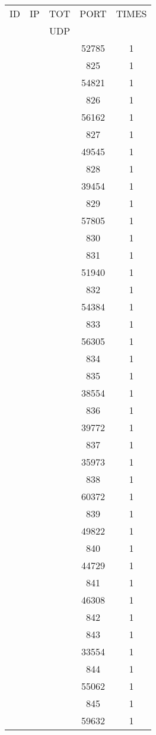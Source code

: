 \documentclass[a4paper]{scrartcl}
\begin{document}
\begin{minipage}[b]{0.5\linewidth}
\begin{tabular}{| c | c | c | c | c |}
\hline
ID & IP & TOT & PORT & TIMES \\ 
   &    & UDP &      &       \\ 
\hline
& & & 52785 & 1 \\ & & & 825 & 1 \\ & & & 54821 & 1 \\ & & & 826 & 1 \\ & & & 56162 & 1 \\ & & & 827 & 1 \\ & & & 49545 & 1 \\ & & & 828 & 1 \\ & & & 39454 & 1 \\ & & & 829 & 1 \\ & & & 57805 & 1 \\ & & & 830 & 1 \\ & & & 831 & 1 \\ & & & 51940 & 1 \\ & & & 832 & 1 \\ & & & 54384 & 1 \\ & & & 833 & 1 \\ & & & 56305 & 1 \\ & & & 834 & 1 \\ & & & 835 & 1 \\ & & & 38554 & 1 \\ & & & 836 & 1 \\ & & & 39772 & 1 \\ & & & 837 & 1 \\ & & & 35973 & 1 \\ & & & 838 & 1 \\ & & & 60372 & 1 \\ & & & 839 & 1 \\ & & & 49822 & 1 \\ & & & 840 & 1 \\ & & & 44729 & 1 \\ & & & 841 & 1 \\ & & & 46308 & 1 \\ & & & 842 & 1 \\ & & & 843 & 1 \\ & & & 33554 & 1 \\ & & & 844 & 1 \\ & & & 55062 & 1 \\ & & & 845 & 1 \\ & & & 59632 & 1 \\ \hline\end{tabular}\end{minipage} \hfill\begin{minipage}[b]{0.5\linewidth}\begin{tabular}{| c | c | c | c | c |}

\end{tabular}
\end{minipage}
\end{document}
